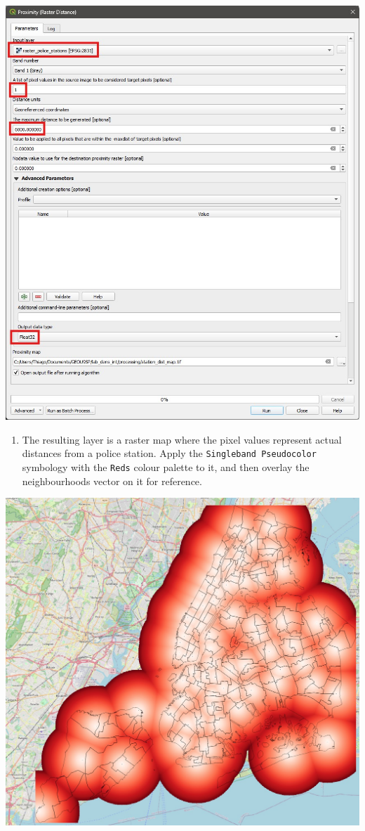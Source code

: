 \documentclass[
  letterpaper,
  DIV=11,
  numbers=noendperiod]{scrreprt}
\providecommand{\tightlist}{%
  \setlength{\itemsep}{0pt}\setlength{\parskip}{0pt}}\usepackage{longtable,booktabs,array}
\begin{document}
\includegraphics{images/lab_13/lab_13_proximity.jpg}

\begin{enumerate}
\def\labelenumi{(\arabic{enumi})}
\setcounter{enumi}{350}
\tightlist
\item
  The resulting layer is a raster map where the pixel values represent
  actual distances from a police station. Apply the
  \texttt{Singleband\ Pseudocolor} symbology with the \texttt{Reds}
  colour palette to it, and then overlay the neighbourhoods vector on it
  for reference.
\end{enumerate}

\includegraphics{images/lab_13/lab13_fig_distmap.jpg}
\end{document}
